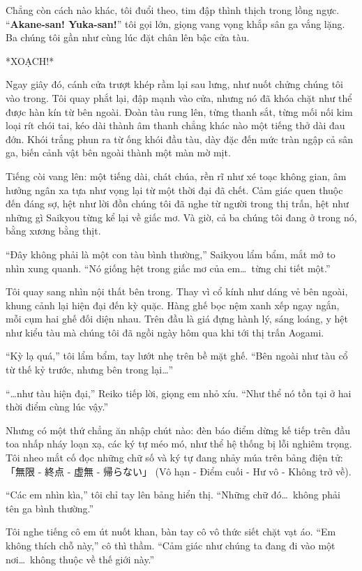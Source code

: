 \documentclass[../main.tex]{subfiles}
\begin{document}
Chẳng còn cách nào khác, tôi đuổi theo, tim đập thình thịch trong lồng ngực. ``\textbf{Akane-san! Yuka-san!}'' tôi gọi lớn, giọng vang vọng khắp sân ga vắng lặng. Ba chúng tôi gần như cùng lúc đặt chân lên bậc cửa tàu.

*XOẠCH!*

Ngay giây đó, cánh cửa trượt khép rầm lại sau lưng, như nuốt chửng chúng tôi vào trong. Tôi quay phắt lại, đập mạnh vào cửa, nhưng nó đã khóa chặt như thể được hàn kín từ bên ngoài. Đoàn tàu rung lên, từng thanh sắt, từng mối nối kim loại rít chói tai, kéo dài thành âm thanh chẳng khác nào một tiếng thở dài đau đớn. Khói trắng phun ra từ ống khói đầu tàu, dày đặc đến mức tràn ngập cả sân ga, biến cảnh vật bên ngoài thành một màn mờ mịt.

Tiếng còi vang lên: một tiếng dài, chát chúa, rền rĩ như xé toạc không gian, âm hưởng ngân xa tựa như vọng lại từ một thời đại đã chết. Cảm giác quen thuộc đến đáng sợ, hệt như lời đồn chúng tôi đã nghe từ người trong thị trấn, hệt như những gì Saikyou từng kể lại về giấc mơ. Và giờ, cả ba chúng tôi đang ở trong nó, bằng xương bằng thịt.

``Đây không phải là một con tàu bình thường,'' Saikyou lẩm bẩm, mắt mở to nhìn xung quanh. ``Nó giống hệt trong giấc mơ của em\dots\ từng chi tiết một.''

Tôi quay sang nhìn nội thất bên trong. Thay vì cổ kính như dáng vẻ bên ngoài, khung cảnh lại hiện đại đến kỳ quặc. Hàng ghế bọc nệm xanh xếp ngay ngắn, mỗi cụm hai ghế đối diện nhau. Trên đầu là giá đựng hành lý, sáng loáng, y hệt như kiểu tàu mà chúng tôi đã ngồi ngày hôm qua khi tới thị trấn Aogami.

``Kỳ lạ quá,'' tôi lẩm bẩm, tay lướt nhẹ trên bề mặt ghế. ``Bên ngoài như tàu cổ từ thế kỷ trước, nhưng bên trong lại\dots''

``\dots như tàu hiện đại,'' Reiko tiếp lời, giọng em nhỏ xíu. ``Như thể nó tồn tại ở hai thời điểm cùng lúc vậy.''


Nhưng có một thứ chẳng ăn nhập chút nào: đèn báo điểm dừng kế tiếp trên đầu toa nhấp nháy loạn xạ, các ký tự méo mó, như thể hệ thống bị lỗi nghiêm trọng. Tôi nheo mắt cố đọc những chữ số và ký tự đang nhảy múa trên bảng điện tử: 「無限 - 終点 - 虚無 - 帰らない」 (Vô hạn - Điểm cuối - Hư vô - Không trở về).

``Các em nhìn kìa,'' tôi chỉ tay lên bảng hiển thị. ``Những chữ đó\dots\ không phải tên ga bình thường.''

Tôi nghe tiếng cô em út nuốt khan, bàn tay cô vô thức siết chặt vạt áo. ``Em không thích chỗ này,'' cô thì thầm. ``Cảm giác như chúng ta đang đi vào một nơi\dots\ không thuộc về thế giới này.''
\end{document}
